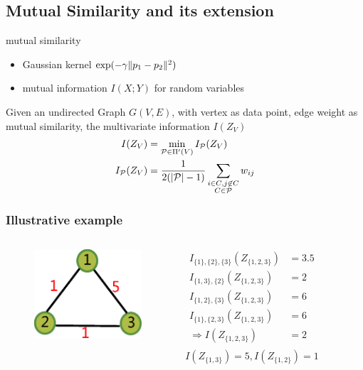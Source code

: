 \documentclass{beamer}
\DeclarePairedDelimiter\abs{\lvert}{\rvert}
\DeclarePairedDelimiter\norm{\lVert}{\rVert}
\begin{document}
\subsection{Mutual Similarity and its extension}
\begin{frame}
\begin{block}{mutual similarity}
\begin{itemize}
\item Gaussian kernel $ \exp({-\gamma \norm{p_1 - p_2}^2})$
\item mutual information $I(X;Y)$ for random variables
\end{itemize}
\end{block}

\begin{definition}
Given an undirected Graph $G(V, E)$, with vertex as data point, edge weight as mutual similarity, the multivariate information $I(Z_V)$
\begin{align}
I(Z_V) & = \min_{\mathcal{P} \in \Pi'(V)} I_{\mathcal{P}}(Z_V) \\
\label{eq:newDef}  I_{\mathcal{P}}(Z_V) & = {1 \over 2 ( \abs{\mathcal{P}} - 1) } \sum_{\substack{i\in C, j \not\in C\\ C\in \mathcal{P}}} w_{ij}
\end{align}
\end{definition}
\end{frame}
\begin{frame}
\frametitle{Illustrative example}
\begin{columns}
\column{5cm}
\begin{figure}
\includegraphics[width=4cm]{pic/example.eps}
\end{figure}
\column{5cm}
\begin{align*}
I_{\{1\},\{2\},\{3\}}(Z_{\{1,2,3\}}) & = 3.5 \\
I_{\{1,3\},\{2\}}(Z_{\{1,2,3\}}) & = 2 \\ 
I_{\{1,2\},\{3\}}(Z_{\{1,2,3\}}) & = 6 \\ 
I_{\{1\},\{2,3\}}(Z_{\{1,2,3\}}) & = 6 \\ 
\Rightarrow I(Z_{\{1,2,3\}}) & = 2 \\
\end{align*}
\begin{equation*}
I(Z_{\{1,3\}}) = 5, I(Z_{\{1,2\}}) = 1
\end{equation*}
\end{columns}
\end{frame}
\end{document}
